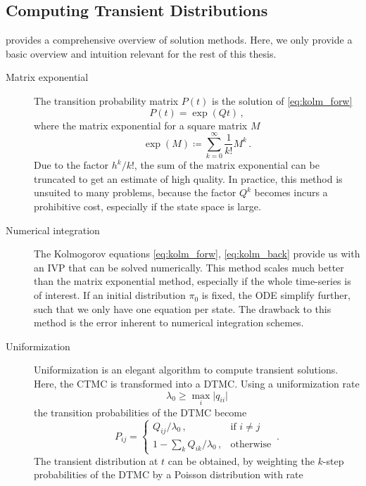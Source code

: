 \subsection{Computing Transient Distributions}
\citet{stewart1994introduction} provides a comprehensive overview of solution methods.
Here, we only provide a basic overview and intuition relevant for the rest of this thesis.
\begin{description}
    \item[Matrix exponential]
        The transition probability matrix $P(t)$ is the solution of \eqref{eq:kolm_forw}
        \[
            P(t)=\exp(Qt)\,,
        \]
        where the matrix exponential for a square matrix $M$
        \[
        \exp({M})\coloneqq\sum_{k=0}^{\infty}\frac{1}{k!}M^k\,.
    \]
        Due to the factor ${h^k}/{k!}$, the sum of the matrix exponential
        can be truncated to get an estimate
        of high quality. In practice, this method is unsuited to many problems, because
        the factor $Q^k$ becomes incurs a prohibitive cost, especially if the state space
        is large.
    \item[Numerical integration]
        The Kolmogorov equations \eqref{eq:kolm_forw}, \eqref{eq:kolm_back}
        provide us with an \ac{IVP} that can be solved
        numerically.
        This method scales much better than the matrix exponential method,
        especially if the whole time-series is of interest. If an initial distribution
        $\pi_0$ is fixed, the \ac{ODE} simplify further, such that we only have one equation
        per state.
        The drawback to this method is the error inherent to numerical
        integration schemes.
    \item[Uniformization]\label{item:uniformization}
        Uniformization is an elegant algorithm to compute transient solutions.
        Here, the \ac{CTMC} is transformed into a \ac{DTMC}.
        Using a uniformization rate \[\lambda_0\geq\max_{i}\lvert q_{ii}\rvert\]
        the transition probabilities of the \ac{DTMC} become
        \[
        P_{ij} =
        \begin{cases}
            Q_{ij} / \lambda_0\,, &\text{if } i\neq j\\
            1 - \sum_k Q_{ik} / \lambda_0\,, &\text{otherwise}
        \end{cases}\,.
    \]
        The transient distribution at $t$ can be obtained, by weighting the $k$-step
        probabilities of the \ac{DTMC} by a Poisson distribution with rate

\end{description}
